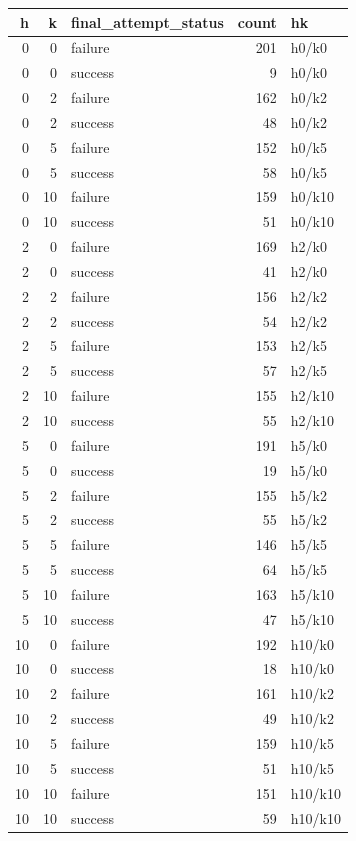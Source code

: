 \begin{tabular}{rrlrl}
\toprule
h & k & final_attempt_status & count & hk \\
\midrule
0 & 0 & failure & 201 & h0/k0 \\
0 & 0 & success & 9 & h0/k0 \\
0 & 2 & failure & 162 & h0/k2 \\
0 & 2 & success & 48 & h0/k2 \\
0 & 5 & failure & 152 & h0/k5 \\
0 & 5 & success & 58 & h0/k5 \\
0 & 10 & failure & 159 & h0/k10 \\
0 & 10 & success & 51 & h0/k10 \\
2 & 0 & failure & 169 & h2/k0 \\
2 & 0 & success & 41 & h2/k0 \\
2 & 2 & failure & 156 & h2/k2 \\
2 & 2 & success & 54 & h2/k2 \\
2 & 5 & failure & 153 & h2/k5 \\
2 & 5 & success & 57 & h2/k5 \\
2 & 10 & failure & 155 & h2/k10 \\
2 & 10 & success & 55 & h2/k10 \\
5 & 0 & failure & 191 & h5/k0 \\
5 & 0 & success & 19 & h5/k0 \\
5 & 2 & failure & 155 & h5/k2 \\
5 & 2 & success & 55 & h5/k2 \\
5 & 5 & failure & 146 & h5/k5 \\
5 & 5 & success & 64 & h5/k5 \\
5 & 10 & failure & 163 & h5/k10 \\
5 & 10 & success & 47 & h5/k10 \\
10 & 0 & failure & 192 & h10/k0 \\
10 & 0 & success & 18 & h10/k0 \\
10 & 2 & failure & 161 & h10/k2 \\
10 & 2 & success & 49 & h10/k2 \\
10 & 5 & failure & 159 & h10/k5 \\
10 & 5 & success & 51 & h10/k5 \\
10 & 10 & failure & 151 & h10/k10 \\
10 & 10 & success & 59 & h10/k10 \\
\bottomrule
\end{tabular}
